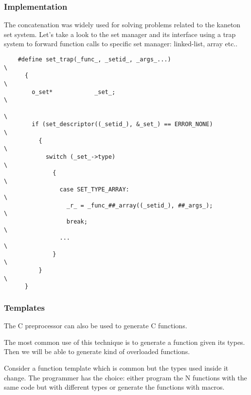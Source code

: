 
\begin{frame}[containsverbatim]
  \frametitle{Implementation}

  The concatenation was widely used for solving problems related to
  the kaneton set system. Let's take a look to the set manager and its
  interface using a trap system to forward function calls to specific
  set manager: linked-list, array etc..

  \nl

  \begin{verbatim}
    #define set_trap(_func_, _setid_, _args_...)                            \
      {                                                                     \
        o_set*            _set_;                                            \
                                                                            \
        if (set_descriptor((_setid_), &_set_) == ERROR_NONE)                \
          {                                                                 \
            switch (_set_->type)                                            \
              {                                                             \
                case SET_TYPE_ARRAY:                                        \
                  _r_ = _func_##_array((_setid_), ##_args_);                \
                  break;                                                    \
                ...                                                         \
              }                                                             \
          }                                                                 \
      }
  \end{verbatim}
\end{frame}


\begin{frame}
  \frametitle{Templates}

  The C preprocessor can also be used to generate C functions.

  \nl

  The most common use of this technique is to generate a function given
  its types. Then we will be able to generate kind of overloaded
  functions.

  \nl

  Consider a function template which is common but the types used inside
  it change. The programmer has the choice: either program the N functions
  with the same code but with different types or generate the functions
  with macros.
\end{frame}

